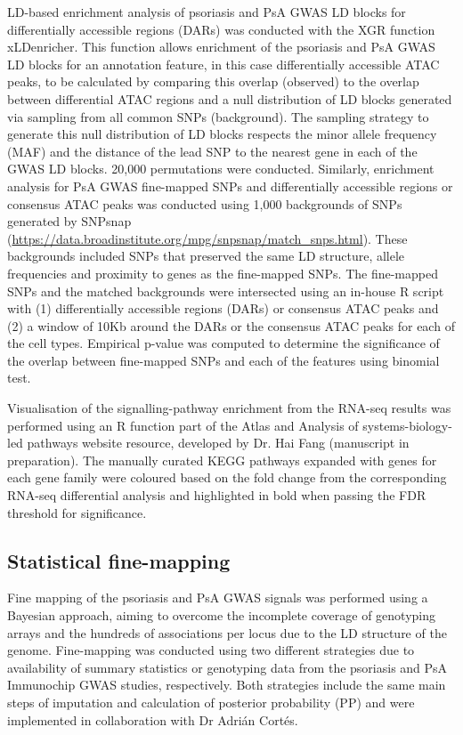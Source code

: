 LD-based enrichment analysis of psoriasis and PsA GWAS LD blocks for differentially accessible regions (DARs) was conducted with the XGR function xLDenricher. This function allows enrichment of the psoriasis and PsA GWAS LD blocks for an annotation feature, in this case differentially accessible ATAC peaks, to be calculated by comparing this overlap (observed) to the overlap between differential ATAC regions and a null distribution of LD blocks generated via sampling from all common SNPs (background). The sampling strategy to generate this null distribution of LD blocks respects the minor allele frequency (MAF) and the distance of the lead SNP to the nearest gene in each of the GWAS LD blocks. 20,000 permutations were conducted. Similarly, enrichment analysis for PsA GWAS fine-mapped SNPs and differentially accessible regions or consensus ATAC peaks was conducted using 1,000 backgrounds of SNPs generated by SNPsnap (\url{https://data.broadinstitute.org/mpg/snpsnap/match_snps.html}). These backgrounds included SNPs that preserved the same LD structure, allele frequencies and proximity to genes as the fine-mapped SNPs. The fine-mapped SNPs and the matched backgrounds were intersected using an in-house R script with (1) differentially accessible regions (DARs) or consensus ATAC peaks and (2) a window of 10Kb around the DARs or the consensus ATAC peaks for each of the cell types. Empirical p-value was computed to determine the significance of the overlap between fine-mapped SNPs and each of the features using binomial test.

Visualisation of the signalling-pathway enrichment from the RNA-seq results was performed using an R function part of the Atlas and Analysis of systems-biology-led pathways website resource, developed by Dr. Hai Fang (manuscript in preparation). The manually curated KEGG pathways expanded with genes for each gene family were coloured based on the fold change from the corresponding RNA-seq differential analysis and highlighted in bold when passing the FDR threshold for significance.


\subsection{Statistical fine-mapping}
Fine mapping of the psoriasis and PsA GWAS signals was performed using a Bayesian approach, aiming to overcome the incomplete coverage of genotyping arrays and the hundreds of associations per locus due to the LD structure of the genome. Fine-mapping was conducted using two different strategies due to availability of summary statistics or genotyping data from the psoriasis and PsA Immunochip GWAS studies, respectively. Both strategies include the same main steps of imputation and calculation of posterior probability (PP) and were implemented in collaboration with Dr Adri\'{a}n Cort\'{e}s.


